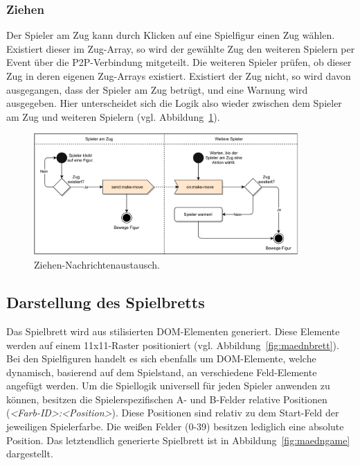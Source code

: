 \subsubsection{Ziehen}
Der Spieler am Zug kann durch Klicken auf eine Spielfigur einen Zug wählen. Existiert dieser im Zug-Array, so wird der gewählte Zug den weiteren Spielern per Event über die \acs{P2P}-Verbindung mitgeteilt. Die weiteren Spieler prüfen, ob dieser Zug in deren eigenen Zug-Arrays existiert. Existiert der Zug nicht, so wird davon ausgegangen, dass der Spieler am Zug betrügt, und eine Warnung wird ausgegeben. Hier unterscheidet sich die Logik also wieder zwischen dem Spieler am Zug und weiteren Spielern (vgl. Abbildung~\ref{fig:maednziehen}).

\vspace{6pt}
\begin{figure}[h]
\centering
\includegraphics[width=0.90\textwidth]{bilder/PDF_SVG/MAEDN_ZIEHEN.pdf}
\caption{Ziehen-Nachrichtenaustausch.}
\label{fig:maednziehen}
\end{figure}

\subsection{Darstellung des Spielbretts}
Das Spielbrett wird aus stilisierten \acf{DOM}-Elementen generiert. Diese Elemente werden auf einem 11x11-Raster positioniert (vgl. Abbildung~\ref{fig:maednbrett}). Bei den Spielfiguren handelt es sich ebenfalls um \acs{DOM}-Elemente, welche dynamisch, basierend auf dem Spielstand, an verschiedene Feld-Elemente angefügt werden. Um die Spiellogik universell für jeden Spieler anwenden zu können, besitzen die Spielerspezifischen A- und B-Felder \glqq{}relative\grqq{} Positionen (\textit{<Farb-ID>:<Position>}). Diese Positionen sind relativ zu dem Start-Feld der jeweiligen Spielerfarbe. Die \glqq{}weißen\grqq{} Felder (0-39) besitzen lediglich eine \glqq{}absolute\grqq{} Position. Das letztendlich generierte Spielbrett ist in Abbildung~\ref{fig:maedngame} dargestellt.\par

